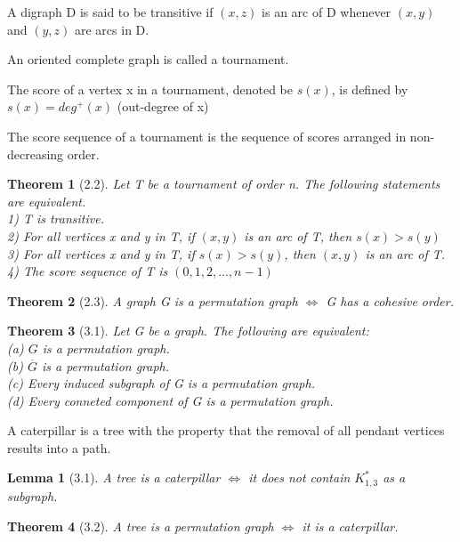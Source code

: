 \documentclass{article}
\newtheorem*{theorem}{Theorem}
\newtheorem*{lemma}{Lemma}
\begin{document}
A digraph D is said to be transitive if $(x, z)$ is an arc of D whenever $(x, y)$ and $(y, z)$ are arcs in D.

An oriented complete graph is called a tournament.

The score of a vertex x in a tournament, denoted be $s(x)$, is defined by $s(x) = deg^{+}(x)$ (out-degree of x)

The score sequence of a tournament is the sequence of scores arranged in non-decreasing order.

\begin{theorem}[2.2]
    Let T be a tournament of order n. The following statements are equivalent.\\
    1) T is transitive. \\
    2) For all vertices x and y in T, if $(x, y)$ is an arc of T, then $s(x) > s(y)$ \\
    3) For all vertices x and y in T, if $s(x) > s(y)$, then $(x, y)$ is an arc of T. \\
    4) The score sequence of T is $(0, 1, 2,..., n-1)$

\end{theorem}

\begin{theorem}[2.3]
    A graph G is a permutation graph $\Leftrightarrow$ G has a cohesive order.
\end{theorem}

\begin{theorem}[3.1]
    Let G be a graph. The following are equivalent:\\
    (a) $G$ is a permutation graph. \\
    (b) $\overline G$ is a permutation graph. \\
    (c) Every induced subgraph of G is a permutation graph. \\
    (d) Every conneted component of G is a permutation graph. \\
\end{theorem}

A caterpillar is a tree with the property that the removal of all pendant vertices results into a path.

\begin{lemma}[3.1]
    A tree is a caterpillar $\Leftrightarrow$ it does not contain $K^*_{1, 3}$ as a subgraph.
\end{lemma}

\begin{theorem}[3.2]
    A tree is a permutation graph $\Leftrightarrow$ it is a caterpillar.
\end{theorem}
\end{document}
